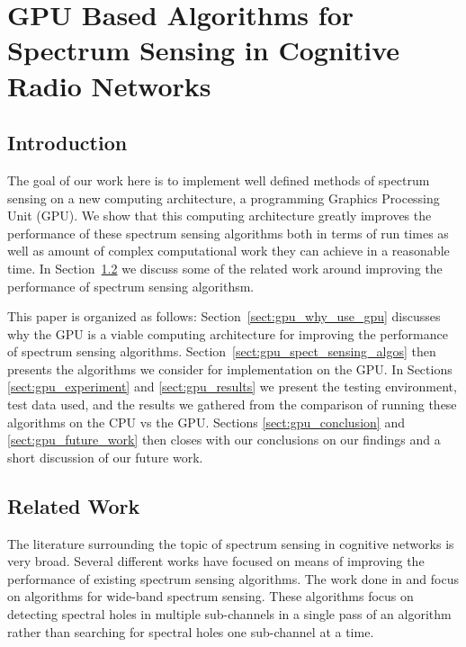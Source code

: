 \chapter{GPU Based Algorithms for Spectrum Sensing in Cognitive Radio Networks}
\label{chap:cognet_gpu}
\section{Introduction}

The goal of our work here is to implement well defined methods of spectrum sensing on a new computing architecture, a programming Graphics Processing Unit (GPU).  We show that this computing architecture greatly improves the performance of these spectrum sensing algorithms both in terms of run times as well as amount of complex computational work they can achieve in a reasonable time.  In Section~\ref{sect:gpu_related_work} we discuss some of the related work around improving the performance of spectrum sensing algorithsm.  

This paper is organized as follows: Section~\ref{sect:gpu_why_use_gpu} discusses why the GPU is a viable computing architecture for improving the performance of spectrum sensing algorithms.  Section~\ref{sect:gpu_spect_sensing_algos} then presents the algorithms we consider for implementation on the GPU.  In Sections \ref{sect:gpu_experiment} and \ref{sect:gpu_results} we present the testing environment, test data used, and the results we gathered from the comparison of running these algorithms on the CPU vs the GPU.  Sections \ref{sect:gpu_conclusion} and \ref{sect:gpu_future_work} then closes with our conclusions on our findings and a short discussion of our future work.

\section{Related Work}
\label{sect:gpu_related_work}
The literature surrounding the topic of spectrum sensing in cognitive networks is very broad.  Several different works have focused on means of improving the performance of existing spectrum sensing algorithms.  The work done in \cite{HurParWoo06} and \cite{QuaCuiSay08} focus on algorithms for wide-band spectrum sensing.  These algorithms focus on detecting spectral holes in multiple sub-channels in a single pass of an algorithm rather than searching for spectral holes one sub-channel at a time.

